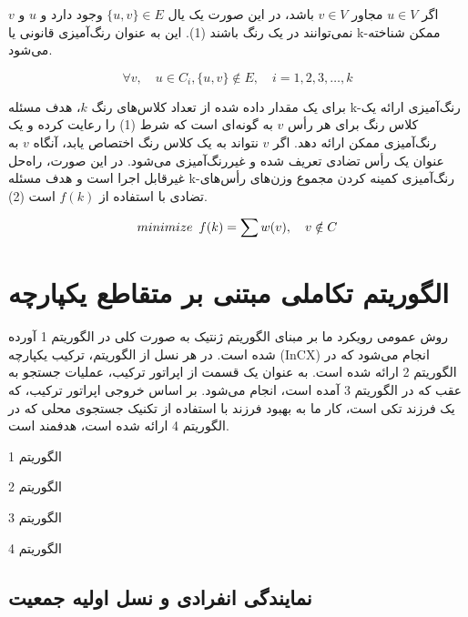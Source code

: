 \documentclass[a4paper,10pt]{article}
\begin{document}
        اگر $u \in V$ مجاور $v \in V$ باشد، در این صورت یک یال $\{u, v\} \in E$ وجود دارد و $u$ و $v$ نمی‌توانند در یک رنگ باشند (1). این به عنوان رنگ‌آمیزی قانونی یا k-ممکن شناخته می‌شود.
        
        \vspace{-0.5cm}

        \begin{equation} 
            \forall v, \hspace{1em} u \in C_i, \{u, v\} \notin E, \hspace{1em} i = 1, 2, 3, \dots, k
        \end{equation}

        برای یک مقدار داده شده از تعداد کلاس‌های رنگ $k$، هدف مسئله k-رنگ‌آمیزی ارائه یک کلاس رنگ برای هر رأس $v$ به گونه‌ای است که شرط (1) را رعایت کرده و یک رنگ‌آمیزی ممکن ارائه دهد. اگر $v$ نتواند به یک کلاس رنگ اختصاص یابد، آنگاه $v$ به عنوان یک رأس تضادی تعریف شده و غیررنگ‌آمیزی می‌شود. در این صورت، راه‌حل غیرقابل اجرا است و هدف مسئله k-رنگ‌آمیزی کمینه کردن مجموع وزن‌های رأس‌های تضادی با استفاده از $f(k)$ است (2).

        \vspace{-0.5cm}

        \begin{equation}
            minimize \hspace{0.5em} f(k) = \sum w(v), \hspace{1em} v \notin C
        \end{equation}

    \section{الگوریتم تکاملی مبتنی بر متقاطع یکپارچه}

        روش عمومی رویکرد ما بر مبنای الگوریتم ژنتیک به صورت کلی در الگوریتم 1 آورده شده است. در هر نسل از الگوریتم، ترکیب یکپارچه (InCX) انجام می‌شود که در الگوریتم 2 ارائه شده است. به عنوان یک قسمت از اپراتور ترکیب، عملیات جستجو به عقب که در الگوریتم 3 آمده است، انجام می‌شود. بر اساس خروجی اپراتور ترکیب، که یک فرزند تکی است، کار ما به بهبود فرزند با استفاده از تکنیک جستجوی محلی که در الگوریتم 4 ارائه شده است، هدفمند است.

        الگوریتم 1

        الگوریتم 2

        الگوریتم 3

        الگوریتم 4

        \subsection{نمایندگی انفرادی و نسل اولیه جمعیت}
\end{document}
